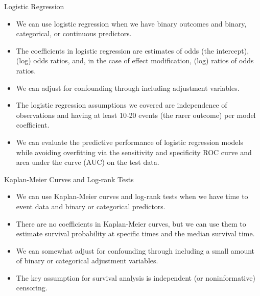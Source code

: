 \documentclass[10pt,t]{beamer}
\begin{document}
\begin{frame}{Logistic Regression}
	\begin{itemize}
		\item We can use logistic regression when we have binary outcomes and binary, categorical, or continuous predictors.
		
		\medskip
		
		\item The coefficients in logistic regression are estimates of odds (the intercept), (log) odds ratios, and, in the case of effect modification, (log) ratios of odds ratios.
		
		\medskip
		
		\item We can adjust for confounding through including adjustment variables.
		
		\medskip
		
		\item The logistic regression assumptions we covered are independence of observations and having at least 10-20 events (the rarer outcome) per model coefficient.
		
		\medskip
		
		\item We can evaluate the predictive performance of logistic regression models while avoiding overfitting via the sensitivity and specificity ROC curve and area under the curve (AUC) on the test data. 
	\end{itemize}
\end{frame}

\begin{frame}{Kaplan-Meier Curves and Log-rank Tests}
	\begin{itemize}
		\item We can use Kaplan-Meier curves and log-rank tests when we have time to event data and binary or categorical predictors.
		
		\medskip
		
		\item There are no coefficients in Kaplan-Meier curves, but we can use them to estimate survival probability at specific times and the median survival time.
		
		\medskip
		
		\item We can somewhat adjust for confounding through including a small amount of binary or categorical adjustment variables.
		
		\medskip
		
		\item The key assumption for survival analysis is independent (or noninformative) censoring.
		

	\end{itemize}
\end{frame}
\end{document}
